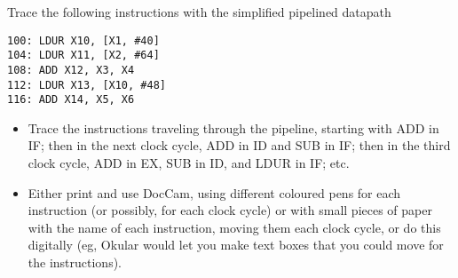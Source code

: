 \begin{frame}[fragile]
  \bigskip
\SizeC
 \begin{tcolorbox}[enhanced,attach boxed title to top center={yshift=-3mm,yshifttext=-1mm},
  colback=red!5!white,colframe=red!75!black,colbacktitle=red!80!black,
  title=Try this,fonttitle=\bfseries,
  boxed title style={size=small,colframe=red!50!black} ]
  {\footnotesize
Trace the following instructions with the simplified pipelined datapath

\begin{verbatim}
100: LDUR X10, [X1, #40]       
104: LDUR X11, [X2, #64]          
108: ADD X12, X3, X4 
112: LDUR X13, [X10, #48]
116: ADD X14, X5, X6
\end{verbatim}
}
\end{tcolorbox}
\BNotes\ifnum{}
\begin{itemize}
\item Trace the instructions traveling through the pipeline, starting with ADD in IF; then in the next clock cycle, ADD in ID and SUB in IF; then in the third clock cycle, ADD in EX, SUB in ID, and LDUR in IF; etc.
  \item Either print and use DocCam, using different coloured pens for each instruction (or possibly, for each clock cycle) or with small pieces of paper with the name of each instruction, moving them each clock cycle, or do this digitally (eg, Okular would let you make text boxes that you could move for the instructions).
\end{itemize}
\fi\ENotes
\end{frame}

\ifnum{}\fi

